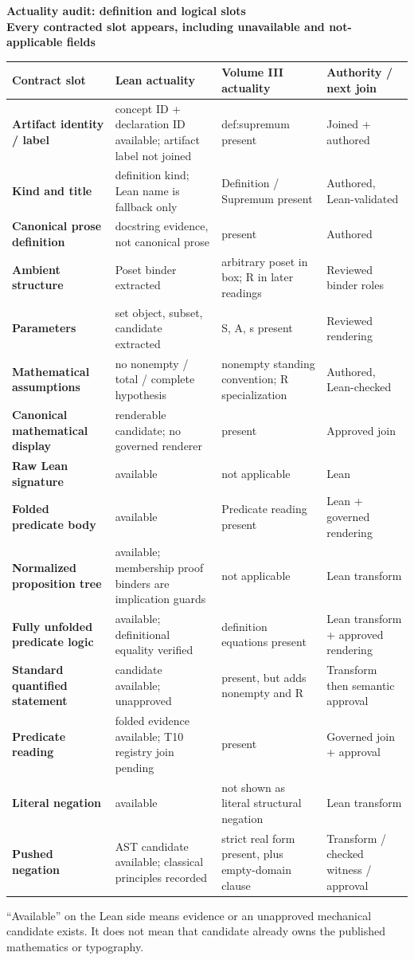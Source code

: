 \documentclass[10pt]{article}
\newcommand{\PageTitle}[2]{\begin{center}\sffamily\Large\bfseries #1\\[-1pt]\small\mdseries #2\end{center}\vspace{-4pt}}
\newcommand{\AuditHead}{\textbf{Contract slot} & \textbf{Lean actuality} & \textbf{Volume III actuality} & \textbf{Authority / next join}\\}
\begin{document}
\PageTitle{Actuality audit: definition and logical slots}{Every contracted slot appears, including unavailable and not-applicable fields}
\scriptsize
\renewcommand{\arraystretch}{1.22}
\begin{tabularx}{\textwidth}{@{}p{}X X p{}@{}}
\toprule
\AuditHead
\midrule
\textbf{Artifact identity / label} & concept ID + declaration ID available; artifact label not joined & def:supremum present & Joined + authored \\
\textbf{Kind and title} & definition kind; Lean name is fallback only & Definition / Supremum present & Authored, Lean-validated \\
\textbf{Canonical prose definition} & docstring evidence, not canonical prose & present & Authored \\
\textbf{Ambient structure} & Poset binder extracted & arbitrary poset in box; R in later readings & Reviewed binder roles \\
\textbf{Parameters} & set object, subset, candidate extracted & S, A, s present & Reviewed rendering \\
\textbf{Mathematical assumptions} & no nonempty / total / complete hypothesis & nonempty standing convention; R specialization & Authored, Lean-checked \\
\textbf{Canonical mathematical display} & renderable candidate; no governed renderer & present & Approved join \\
\textbf{Raw Lean signature} & available & not applicable & Lean \\
\textbf{Folded predicate body} & available & Predicate reading present & Lean + governed rendering \\
\textbf{Normalized proposition tree} & available; membership proof binders are implication guards & not applicable & Lean transform \\
\textbf{Fully unfolded predicate logic} & available; definitional equality verified & definition equations present & Lean transform + approved rendering \\
\textbf{Standard quantified statement} & candidate available; unapproved & present, but adds nonempty and R & Transform then semantic approval \\
\textbf{Predicate reading} & folded evidence available; T10 registry join pending & present & Governed join + approval \\
\textbf{Literal negation} & available & not shown as literal structural negation & Lean transform \\
\textbf{Pushed negation} & AST candidate available; classical principles recorded & strict real form present, plus empty-domain clause & Transform / checked witness / approval \\
\bottomrule
\end{tabularx}
\par\medskip
\footnotesize
``Available'' on the Lean side means evidence or an unapproved mechanical
candidate exists. It does not mean that candidate already owns the published
mathematics or typography.
\newpage
\end{document}
